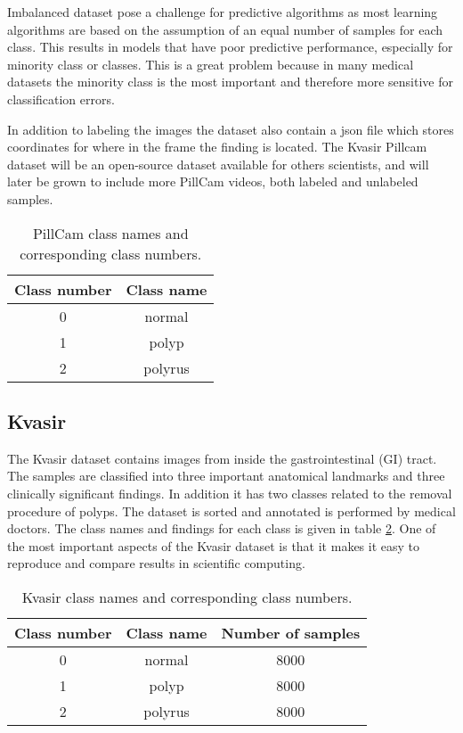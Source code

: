 \documentclass[thesis.tex]{subfiles}
\begin{document}
Imbalanced dataset pose a challenge for predictive algorithms as most learning algorithms are based on the assumption of an equal number of samples for each class. This results in models that have poor predictive performance, especially for minority class or classes. This is a great problem because in many medical datasets the minority class is the most important and therefore more sensitive for classification errors.

In addition to labeling the images the dataset also contain a json file which stores coordinates for where in the frame the finding is located. The Kvasir Pillcam dataset will be an open-source dataset available for others scientists, and will later be grown to include more PillCam videos, both labeled and unlabeled samples.

\begin{table}
  \centering
  \begin{tabular}{ |c|c| }
  	\hline
  	Class number & Class name \\
    \hline
    0 & normal \\ 
    1 & polyp \\ 
    2 & polyrus \\ 
    \hline
  \end{tabular}
  \caption{PillCam class names and corresponding class numbers.}
  \label{table:kvasir_pillcam}
\end{table}


\subsection{Kvasir} \label{kvasir}
The Kvasir dataset \cite{KVASIRMultiClass17} contains images from inside the gastrointestinal (GI) tract. The samples are classified into three important anatomical landmarks and three clinically significant findings. In addition it has two classes related to the removal procedure of polyps. The dataset is sorted and annotated is performed by medical doctors. The class names and findings for each class is given in table \ref{table:kvasir}. One of the most important aspects of the Kvasir dataset is that it makes it easy to reproduce and compare results in scientific computing.

\begin{table}
  \centering
  \begin{tabular}{ |c|c|c| }
  	\hline
  	Class number & Class name & Number of samples \\
    \hline
    0 & normal & 8000 \\ 
    1 & polyp & 8000 \\ 
    2 & polyrus & 8000 \\ 
    \hline
  \end{tabular}
  \caption{Kvasir class names and corresponding class numbers.}
  \label{table:kvasir}
\end{table}
\end{document}
